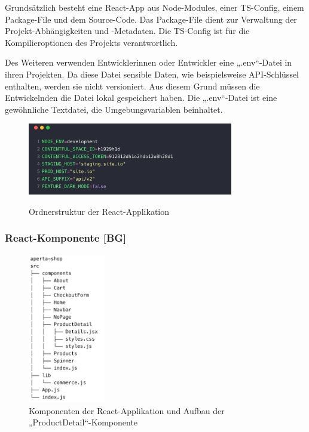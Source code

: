 Grundsätzlich besteht eine React-App aus Node-Modules, einer TS-Config, einem Package-File und dem Source-Code. Das Package-File dient zur Verwaltung der Projekt-Abhängigkeiten und -Metadaten. Die TS-Config ist für die Kompilieroptionen des Projekts verantwortlich.

Des Weiteren verwenden Entwicklerinnen oder Entwickler eine „.env“-Datei in ihren Projekten. Da diese Datei sensible Daten, wie beispielsweise API-Schlüssel enthalten, werden sie nicht versioniert. Aus diesem Grund müssen die Entwickelnden die Datei lokal gespeichert haben. Die „.env“-Datei ist eine gewöhnliche Textdatei, die Umgebungsvariablen beinhaltet.
\cite{envFile}

\begin{figure}[H]
  \centering
  \includegraphics[width=0.8\textwidth]{pics/bsp-env.png}
  \caption{Ordnerstruktur der React-Applikation}
  \cite{envExample}
\end{figure}

\subsubsection{React-Komponente [BG]}

\begin{figure}[H]
  \centering
  \includegraphics[width=0.3\textwidth]{pics/react-komponentenstruktur.png}
  \caption{Komponenten der React-Applikation und Aufbau der „ProductDetail“-Komponente}
\end{figure}

